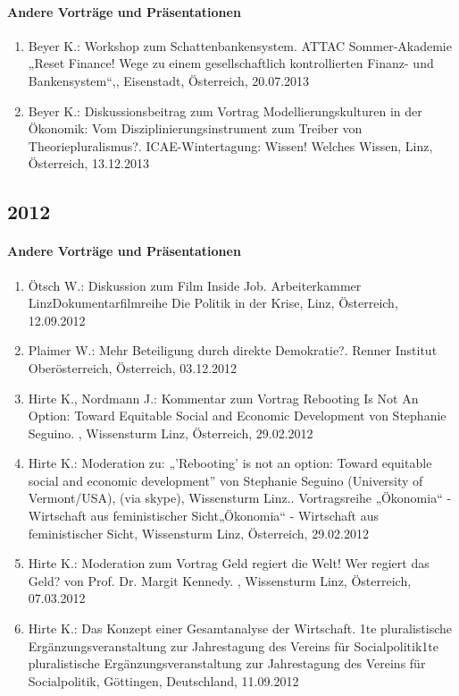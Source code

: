 \paragraph{Andere Vorträge und Präsentationen}
\begin{enumerate}
	\item Beyer K.: Workshop zum Schattenbankensystem. ATTAC Sommer-Akademie „Reset Finance! Wege zu einem gesellschaftlich kontrollierten Finanz- und Bankensystem“,, Eisenstadt, Österreich, 20.07.2013
	\item Beyer K.: Diskussionsbeitrag zum Vortrag Modellierungskulturen in der Ökonomik: Vom Disziplinierungsinstrument zum Treiber von Theoriepluralismus?. ICAE-Wintertagung: Wissen! Welches Wissen, Linz, Österreich, 13.12.2013
\end{enumerate}
\subsection*{2012}
\paragraph{Andere Vorträge und Präsentationen}
\begin{enumerate}
	\item Ötsch W.: Diskussion zum Film Inside Job. Arbeiterkammer LinzDokumentarfilmreihe Die Politik in der Krise, Linz, Österreich, 12.09.2012
	\item Plaimer W.: Mehr Beteiligung durch direkte Demokratie?. Renner Institut Oberösterreich, Österreich, 03.12.2012
	\item Hirte K., Nordmann J.: Kommentar zum Vortrag \glqq Rebooting Is Not An Option: Toward Equitable Social and Economic Development\grqq{} von Stephanie Seguino. , Wissensturm Linz, Österreich, 29.02.2012
	\item Hirte K.: Moderation zu: „’Rebooting’ is not an option: Toward equitable social and economic development” von Stephanie Seguino (University of Vermont/USA), (via skype), Wissensturm Linz.. Vortragsreihe „Ökonomia“ - Wirtschaft aus feministischer Sicht„Ökonomia“ - Wirtschaft aus feministischer Sicht, Wissensturm Linz, Österreich, 29.02.2012
	\item Hirte K.: Moderation zum Vortrag \glqq Geld regiert die Welt! Wer regiert das Geld?\grqq{} von Prof. Dr. Margit Kennedy. , Wissensturm Linz, Österreich, 07.03.2012
	\item Hirte K.: Das Konzept einer Gesamtanalyse der Wirtschaft. 1te pluralistische Ergänzungsveranstaltung zur Jahrestagung des Vereins für Socialpolitik1te pluralistische Ergänzungsveranstaltung zur Jahrestagung des Vereins für Socialpolitik, Göttingen, Deutschland, 11.09.2012
\end{enumerate}
